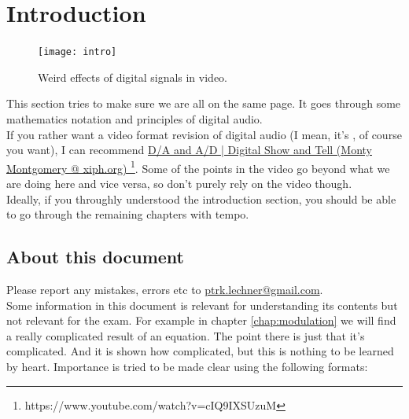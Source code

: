 
\chapter{Introduction}
\label{introduction}

\begin{figure}[h!]
	\centering
	\texttt{[image: intro]}
	\caption[cover]
	{Weird effects of digital signals in video. }
	\label{fig:weirdVideo}
\end{figure}
\clearpage

This section tries to make sure we are all on the same page. It goes through some mathematics notation and principles of digital audio.\\
If you rather want a video format revision of digital audio (I mean, it's \the\year, of course you want), I can recommend \href{https://www.youtube.com/watch?v=cIQ9IXSUzuM}{D/A and A/D | Digital Show and Tell (Monty Montgomery @ xiph.org) }\footnote{https://www.youtube.com/watch?v=cIQ9IXSUzuM}. Some of the points in the video go beyond what we are doing here and vice versa, so don't purely rely on the video though. \\
Ideally, if you throughly understood the introduction section, you should be able to go through the remaining chapters with tempo.\\

\section{About this document}
Please report any mistakes, errors etc to \href{mailto:ptrk.lechner@gmail.com}{ptrk.lechner@gmail.com}.\\

Some information in this document is relevant for understanding its contents but not relevant for the exam. For example in chapter \ref{chap:modulation} we will find a really complicated result of an equation. The point there is just that it's complicated. And it is shown how complicated, but this is nothing to be learned by heart. Importance is tried to be made clear using the following formats:\\



